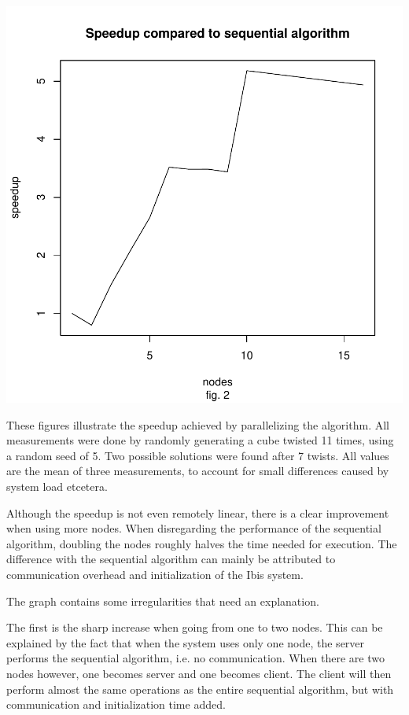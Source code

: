 \documentclass[a4paper,11pt]{article}
\begin{document}
\includegraphics{report-002}

These figures illustrate the speedup achieved by parallelizing the algorithm. All measurements were done by randomly generating a cube twisted 11 times, using a random seed of 5. Two possible solutions were found after 7 twists. All values are the mean of three measurements, to account for small differences caused by system load etcetera.

Although the speedup is not even remotely linear, there is a clear improvement when using more nodes. When disregarding the performance of the sequential algorithm, doubling the nodes roughly halves the time needed for execution. The difference with the sequential algorithm can mainly be attributed to communication overhead and initialization of the Ibis system. 

The graph contains some irregularities that need an explanation. 

The first is the sharp increase when going from one to two nodes. This can be explained by the fact that when the system uses only one node, the server performs the sequential algorithm, i.e. no communication. When there are two nodes however, one becomes server and one becomes client. The client will then perform almost the same operations as the entire sequential algorithm, but with communication and initialization time added. 
\end{document}
